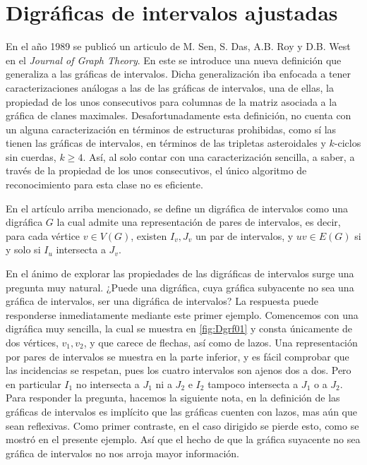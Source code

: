\chapter{Digráficas de intervalos ajustadas}
\label{cap:DigrafIntAj}

En el año 1989 se publicó un articulo de M. Sen, S. Das, A.B. Roy y D.B. West en el  \textit{Journal of Graph Theory}. En este se introduce una nueva definición que generaliza a las gráficas de intervalos. Dicha generalización iba enfocada a tener caracterizaciones análogas a las de las gráficas de intervalos, una de ellas, la propiedad de los unos consecutivos para columnas de la matriz asociada a la gráfica de clanes maximales. 
Desafortunadamente esta definición, no cuenta con un alguna caracterización en términos de estructuras prohibidas, como sí las tienen las gráficas de intervalos, en términos de las tripletas asteroidales y $k$-ciclos sin cuerdas, $k \geq 4$. Así, al solo contar con una caracterización sencilla, a saber, a través de la propiedad de los unos consecutivos, el único algoritmo de reconocimiento para esta clase no es eficiente.

En el artículo arriba mencionado, se define un digráfica de intervalos como una digráfica $G$ la cual admite una representación de pares de intervalos, es decir, para cada vértice $v \in V(G)$, existen $I_v,J_v$ un par de intervalos, y $uv\in E(G)$ si y solo si $I_u$ intersecta a $J_v$. 

En el ánimo de explorar las propiedades de las digráficas de intervalos surge una pregunta muy natural. ¿Puede una digráfica, cuya gráfica subyacente no sea una gráfica de intervalos, ser una digráfica de intervalos? La respuesta puede responderse inmediatamente mediante este primer ejemplo. Comencemos con una digráfica muy sencilla, la cual se muestra en \cref{fig:Dgrf01} y consta únicamente de dos vértices, $v_1, v_2$, y que carece de flechas, así como de lazos. Una representación por pares de intervalos se muestra en la parte inferior, y es fácil comprobar que las incidencias se respetan, pues los cuatro intervalos son ajenos dos a dos. Pero en particular $I_1$ no intersecta a $J_1$ ni a $J_2$ e $I_2$ tampoco intersecta a $J_1$ o a $J_2$. Para responder la pregunta, hacemos la siguiente nota, en la definición de las gráficas de intervalos es implícito que las gráficas cuenten con lazos, mas aún que sean reflexivas. Como primer contraste, en el caso dirigido se pierde esto, como se mostró en el presente ejemplo. Así que el hecho de que la gráfica suyacente no sea gráfica de intervalos no nos arroja mayor información. 

